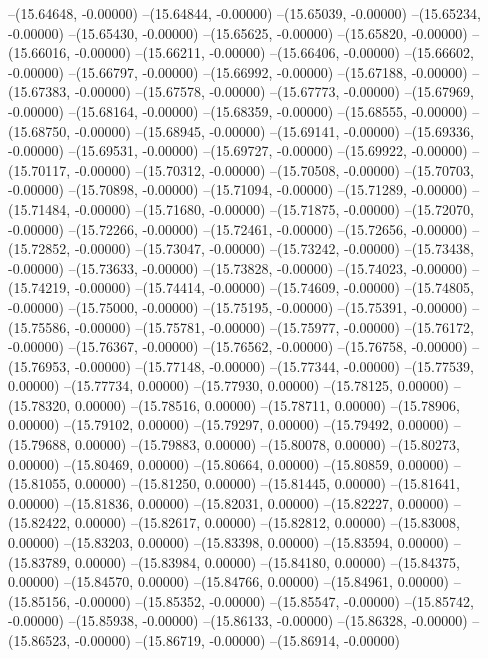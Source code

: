--(15.64648, -0.00000)
--(15.64844, -0.00000)
--(15.65039, -0.00000)
--(15.65234, -0.00000)
--(15.65430, -0.00000)
--(15.65625, -0.00000)
--(15.65820, -0.00000)
--(15.66016, -0.00000)
--(15.66211, -0.00000)
--(15.66406, -0.00000)
--(15.66602, -0.00000)
--(15.66797, -0.00000)
--(15.66992, -0.00000)
--(15.67188, -0.00000)
--(15.67383, -0.00000)
--(15.67578, -0.00000)
--(15.67773, -0.00000)
--(15.67969, -0.00000)
--(15.68164, -0.00000)
--(15.68359, -0.00000)
--(15.68555, -0.00000)
--(15.68750, -0.00000)
--(15.68945, -0.00000)
--(15.69141, -0.00000)
--(15.69336, -0.00000)
--(15.69531, -0.00000)
--(15.69727, -0.00000)
--(15.69922, -0.00000)
--(15.70117, -0.00000)
--(15.70312, -0.00000)
--(15.70508, -0.00000)
--(15.70703, -0.00000)
--(15.70898, -0.00000)
--(15.71094, -0.00000)
--(15.71289, -0.00000)
--(15.71484, -0.00000)
--(15.71680, -0.00000)
--(15.71875, -0.00000)
--(15.72070, -0.00000)
--(15.72266, -0.00000)
--(15.72461, -0.00000)
--(15.72656, -0.00000)
--(15.72852, -0.00000)
--(15.73047, -0.00000)
--(15.73242, -0.00000)
--(15.73438, -0.00000)
--(15.73633, -0.00000)
--(15.73828, -0.00000)
--(15.74023, -0.00000)
--(15.74219, -0.00000)
--(15.74414, -0.00000)
--(15.74609, -0.00000)
--(15.74805, -0.00000)
--(15.75000, -0.00000)
--(15.75195, -0.00000)
--(15.75391, -0.00000)
--(15.75586, -0.00000)
--(15.75781, -0.00000)
--(15.75977, -0.00000)
--(15.76172, -0.00000)
--(15.76367, -0.00000)
--(15.76562, -0.00000)
--(15.76758, -0.00000)
--(15.76953, -0.00000)
--(15.77148, -0.00000)
--(15.77344, -0.00000)
--(15.77539, 0.00000)
--(15.77734, 0.00000)
--(15.77930, 0.00000)
--(15.78125, 0.00000)
--(15.78320, 0.00000)
--(15.78516, 0.00000)
--(15.78711, 0.00000)
--(15.78906, 0.00000)
--(15.79102, 0.00000)
--(15.79297, 0.00000)
--(15.79492, 0.00000)
--(15.79688, 0.00000)
--(15.79883, 0.00000)
--(15.80078, 0.00000)
--(15.80273, 0.00000)
--(15.80469, 0.00000)
--(15.80664, 0.00000)
--(15.80859, 0.00000)
--(15.81055, 0.00000)
--(15.81250, 0.00000)
--(15.81445, 0.00000)
--(15.81641, 0.00000)
--(15.81836, 0.00000)
--(15.82031, 0.00000)
--(15.82227, 0.00000)
--(15.82422, 0.00000)
--(15.82617, 0.00000)
--(15.82812, 0.00000)
--(15.83008, 0.00000)
--(15.83203, 0.00000)
--(15.83398, 0.00000)
--(15.83594, 0.00000)
--(15.83789, 0.00000)
--(15.83984, 0.00000)
--(15.84180, 0.00000)
--(15.84375, 0.00000)
--(15.84570, 0.00000)
--(15.84766, 0.00000)
--(15.84961, 0.00000)
--(15.85156, -0.00000)
--(15.85352, -0.00000)
--(15.85547, -0.00000)
--(15.85742, -0.00000)
--(15.85938, -0.00000)
--(15.86133, -0.00000)
--(15.86328, -0.00000)
--(15.86523, -0.00000)
--(15.86719, -0.00000)
--(15.86914, -0.00000)
